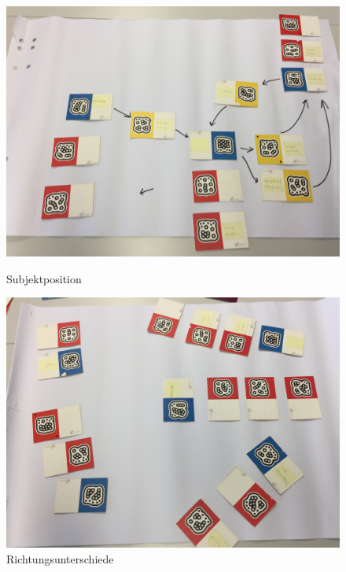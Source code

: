 \begin{figure}[h]
	\centering 
	\begin{minipage}[b]{0.45\textwidth} 
		\includegraphics[width=\textwidth]{figures/03.jpg}
		\caption{Subjektposition \protect~\cite{max}} 
		\label{fig:subjekt-position} 
	\end{minipage}
	\hfill 
	\begin{minipage}[b]{0.45\textwidth} 
		\includegraphics[width=\textwidth]{figures/17.jpg} 		
		\caption{Richtungsunterschiede \protect~\cite{max}} 
		\label{fig:nicht-vertikal} 
	\end{minipage}
\end{figure}

